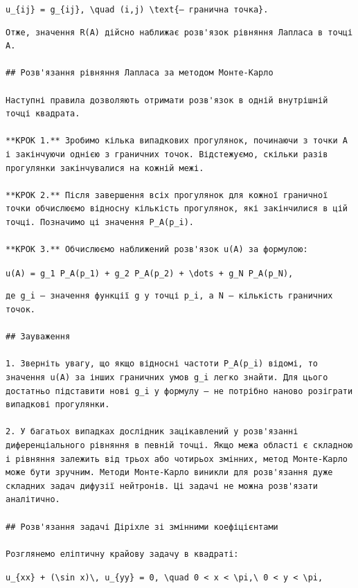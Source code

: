 \documentclass[
  ukrainian,
]{article}
\begin{document}
\texttt{\textquotesingle{}u\_\{ij\}\ =\ g\_\{ij\},\ \textbackslash{}quad\ (i,j)\ \textbackslash{}text\{\textquotesingle{}—\ гранична\ точка\}.}

\begin{verbatim}
Отже, значення R(A) дійсно наближає розв'язок рівняння Лапласа в точці A.

## Розв'язання рівняння Лапласа за методом Монте-Карло

Наступні правила дозволяють отримати розв'язок в одній внутрішній точці квадрата.

**КРОК 1.** Зробимо кілька випадкових прогулянок, починаючи з точки A і закінчуючи однією з граничних точок. Відстежуємо, скільки разів прогулянки закінчувалися на кожній межі.

**КРОК 2.** Після завершення всіх прогулянок для кожної граничної точки обчислюємо відносну кількість прогулянок, які закінчилися в цій точці. Позначимо ці значення P_A(p_i).

**КРОК 3.** Обчислюємо наближений розв'язок u(A) за формулою:
\end{verbatim}

\texttt{u(A)\ =\ g\_1\ P\_A(p\_1)\ +\ g\_2\ P\_A(p\_2)\ +\ \textbackslash{}dots\ +\ g\_N\ P\_A(p\_N),}

\begin{verbatim}
де g_i — значення функції g у точці p_i, а N — кількість граничних точок.

## Зауваження

1. Зверніть увагу, що якщо відносні частоти P_A(p_i) відомі, то значення u(A) за інших граничних умов g_i легко знайти. Для цього достатньо підставити нові g_i у формулу — не потрібно наново розіграти випадкові прогулянки.

2. У багатьох випадках дослідник зацікавлений у розв'язанні диференціального рівняння в певній точці. Якщо межа області є складною і рівняння залежить від трьох або чотирьох змінних, метод Монте-Карло може бути зручним. Методи Монте-Карло виникли для розв'язання дуже складних задач дифузії нейтронів. Ці задачі не можна розв'язати аналітично.

## Розв'язання задачі Діріхле зі змінними коефіцієнтами

Розглянемо еліптичну крайову задачу в квадраті:
\end{verbatim}

\texttt{u\_\{xx\}\ +\ (\textbackslash{}sin\ x)\textbackslash{},\ u\_\{yy\}\ =\ 0,\ \textbackslash{}quad\ 0\ \textless{}\ x\ \textless{}\ \textbackslash{}pi,\textbackslash{}\ 0\ \textless{}\ y\ \textless{}\ \textbackslash{}pi,}
\end{document}
